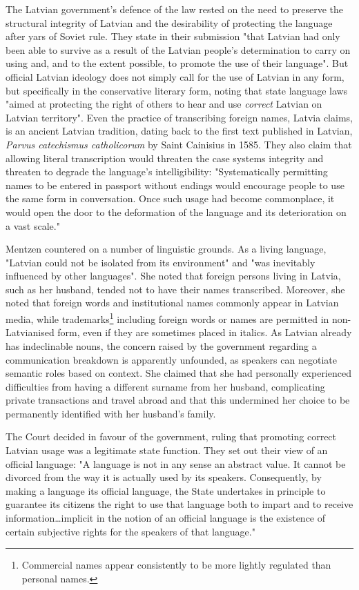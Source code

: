 The Latvian government's defence of the law rested on the need to preserve the
structural integrity of Latvian and the desirability of protecting the language
after yars of Soviet rule. They state in their submission "that Latvian had
only been able to survive as a result of the Latvian people's determination to
carry on using and, and to the extent possible, to promote the use of their
language". But official Latvian ideology does not simply call for the use of
Latvian in any form, but specifically in the conservative literary form, noting
that state language laws "aimed at protecting the right of others to hear and
use \textit{correct} Latvian on Latvian territory". Even the practice of
transcribing foreign names, Latvia claims, is an ancient Latvian tradition,
dating back to the first text published in Latvian, \textit{Parvus catechismus
catholicorum} by Saint Cainisius in 1585. They also claim that allowing literal
transcription would threaten the case systems integrity and threaten to degrade
the language's intelligibility: "Systematically permitting names to be entered
in passport without endings would encourage people to use the same form in
conversation. Once such usage had become commonplace, it would open the door to
the deformation of the language and its deterioration on a vast scale."


Mentzen countered on a number of linguistic grounds. As a living language,
"Latvian could not be isolated from its environment" and "was inevitably
influenced by other languages". She noted that foreign persons living in
Latvia, such as her husband, tended not to have their names transcribed.
Moreover, she noted that foreign words and institutional names commonly appear
in Latvian media, while trademarks\footnote{Commercial names appear
consistently to be more lightly regulated than personal
names.\parencite{varennes15}}  including foreign words or names are permitted
in non-Latvianised form, even if they are sometimes placed in italics. As
Latvian already has indeclinable nouns, the concern raised by the government
regarding a communication breakdown is apparently unfounded, as speakers can
negotiate semantic roles based on context. She claimed that she had personally
experienced difficulties from having a different surname from her husband,
complicating private transactions and travel abroad and that this undermined
her choice to be permanently identified with her husband's family.

The Court decided in favour of the government, ruling that promoting correct
Latvian usage was a legitimate state function. They set out their view of an
official language: "A language is not in any sense an abstract value. It cannot
be divorced from the way it is actually used by its speakers. Consequently, by
making a language its official language, the State undertakes in principle to
guarantee its citizens the right to use that language both to impart and to
receive information…implicit in the notion of an official language is the
existence of certain subjective rights for the speakers of that language."

